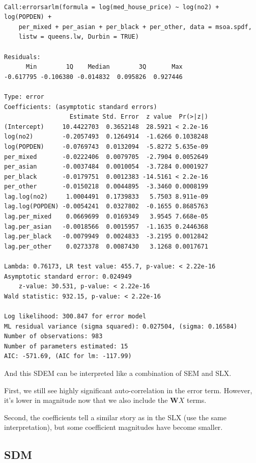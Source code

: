 \documentclass[
  letterpaper,
  DIV=11,
  numbers=noendperiod]{scrreprt}
\begin{document}
\begin{verbatim}

Call:errorsarlm(formula = log(med_house_price) ~ log(no2) + log(POPDEN) + 
    per_mixed + per_asian + per_black + per_other, data = msoa.spdf, 
    listw = queens.lw, Durbin = TRUE)

Residuals:
      Min        1Q    Median        3Q       Max 
-0.617795 -0.106380 -0.014832  0.095826  0.927446 

Type: error 
Coefficients: (asymptotic standard errors) 
                  Estimate Std. Error  z value  Pr(>|z|)
(Intercept)     10.4422703  0.3652148  28.5921 < 2.2e-16
log(no2)        -0.2057493  0.1264914  -1.6266 0.1038248
log(POPDEN)     -0.0769743  0.0132094  -5.8272 5.635e-09
per_mixed       -0.0222406  0.0079705  -2.7904 0.0052649
per_asian       -0.0037484  0.0010054  -3.7284 0.0001927
per_black       -0.0179751  0.0012383 -14.5161 < 2.2e-16
per_other       -0.0150218  0.0044895  -3.3460 0.0008199
lag.log(no2)     1.0004491  0.1739833   5.7503 8.911e-09
lag.log(POPDEN) -0.0054241  0.0327802  -0.1655 0.8685763
lag.per_mixed    0.0669699  0.0169349   3.9545 7.668e-05
lag.per_asian   -0.0018566  0.0015957  -1.1635 0.2446368
lag.per_black   -0.0079949  0.0024833  -3.2195 0.0012842
lag.per_other    0.0273378  0.0087430   3.1268 0.0017671

Lambda: 0.76173, LR test value: 455.7, p-value: < 2.22e-16
Asymptotic standard error: 0.024949
    z-value: 30.531, p-value: < 2.22e-16
Wald statistic: 932.15, p-value: < 2.22e-16

Log likelihood: 300.847 for error model
ML residual variance (sigma squared): 0.027504, (sigma: 0.16584)
Number of observations: 983 
Number of parameters estimated: 15 
AIC: -571.69, (AIC for lm: -117.99)
\end{verbatim}

And this SDEM can be interpreted like a combination of SEM and SLX.

First, we still see highly significant auto-correlation in the error
term. However, it's lower in magnitude now that we also include the
\(\boldsymbol{\mathbf{W}} X\) terms.

Second, the coefficients tell a similar story as in the SLX (use the
same interpretation), but some coefficient magnitudes have become
smaller.

\hypertarget{sdm}{%
\subsection{SDM}\label{sdm}}
\end{document}
